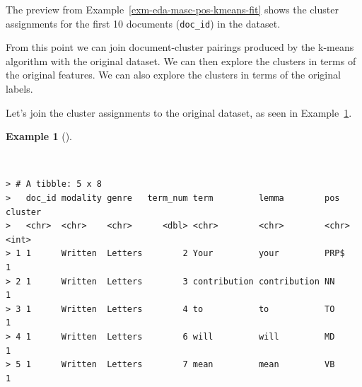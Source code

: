 \documentclass[
  letterpaper,
]{latex/krantz}
\newenvironment{Shaded}{\begin{snugshade}}{\end{snugshade}}
\newcommand{\AttributeTok}[1]{\textcolor[rgb]{0.00,0.00,0.00}{#1}}
\newcommand{\CommentTok}[1]{\textcolor[rgb]{0.00,0.00,0.00}{\textit{#1}}}
\newcommand{\DecValTok}[1]{\textcolor[rgb]{0.00,0.00,0.00}{#1}}
\newcommand{\FunctionTok}[1]{\textcolor[rgb]{0.00,0.00,0.00}{#1}}
\newcommand{\NormalTok}[1]{\textcolor[rgb]{0.00,0.00,0.00}{#1}}
\newcommand{\OtherTok}[1]{\textcolor[rgb]{0.00,0.00,0.00}{#1}}
\newcommand{\SpecialCharTok}[1]{\textcolor[rgb]{0.00,0.00,0.00}{#1}}
\newcommand{\StringTok}[1]{\textcolor[rgb]{0.00,0.00,0.00}{#1}}
\theoremstyle{definition}
\newtheorem{example}{Example}[chapter]
\theoremstyle{remark}
\begin{document}
The preview from Example~\ref{exm-eda-masc-pos-kmeans-fit} shows the
cluster assignments for the first 10 documents (\texttt{doc\_id}) in the
dataset.

From this point we can join document-cluster pairings produced by the
k-means algorithm with the original dataset. We can then explore the
clusters in terms of the original features. We can also explore the
clusters in terms of the original labels.

Let's join the cluster assignments to the original dataset, as seen in
Example~\ref{exm-eda-masc-pos-kmeans-join}.

\begin{example}[]\protect\hypertarget{exm-eda-masc-pos-kmeans-join}{}\label{exm-eda-masc-pos-kmeans-join}

~

\begin{Shaded}
\end{Shaded}

\begin{verbatim}
> # A tibble: 5 x 8
>   doc_id modality genre   term_num term         lemma        pos   cluster
>   <chr>  <chr>    <chr>      <dbl> <chr>        <chr>        <chr>   <int>
> 1 1      Written  Letters        2 Your         your         PRP$        1
> 2 1      Written  Letters        3 contribution contribution NN          1
> 3 1      Written  Letters        4 to           to           TO          1
> 4 1      Written  Letters        6 will         will         MD          1
> 5 1      Written  Letters        7 mean         mean         VB          1
\end{verbatim}

\end{example}
\end{document}
